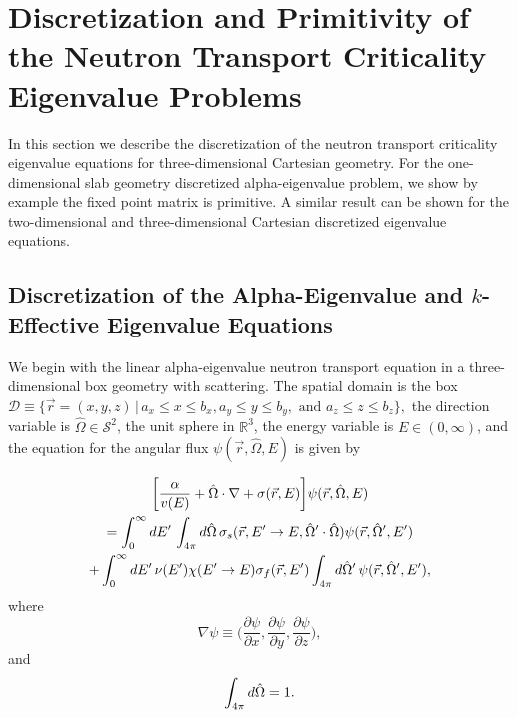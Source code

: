 \chapter{Discretization and Primitivity of the Neutron Transport Criticality Eigenvalue Problems}

In this section we describe the discretization of the neutron transport criticality eigenvalue equations for three-dimensional Cartesian geometry. For the one-dimensional slab geometry discretized alpha-eigenvalue problem, we show by example the fixed point matrix is primitive. A similar result can be shown for the two-dimensional and three-dimensional Cartesian discretized eigenvalue equations.

\section{Discretization of the Alpha-Eigenvalue and $k$-Effective Eigenvalue Equations}

We begin with the linear alpha-eigenvalue neutron transport equation in a three-dimensional box geometry with scattering. The spatial domain is the box $\mathcal{D} \equiv \{\vec{r} = (x, y, z) \, \vert \, a_{x} \leq x \leq b_{x}, a_{y} \leq y \leq b_{y}, \text{ and } a_{z} \leq z \leq b_{z} \},$ the direction variable is $\hat{\Omega} \in \mathcal{S}^{2}$, the unit sphere in $\mathbb{R}^{3}$, the energy variable is $E \in (0, \infty)$, and the equation for the angular flux $\psi(\vec{r}, \hat{\Omega}, E)$ is given by

\begin{multline}
	\bigg [ \frac{\alpha}{v(E)} + \hat{\Omega} \cdot \nabla + \sigma(\vec{r},E) \bigg ] \psi(\vec{r},\hat{\Omega},E) \\ = \int_{0}^{\infty} \mathop{}\!d E' \, \int_{4\pi} \mathop{}\!d \hat{\Omega} \, \sigma_{s}(\vec{r},E'\rightarrow E,\hat{\Omega}' \cdot \hat{\Omega}) \psi(\vec{r},\hat{\Omega}',E') \\ + \int_{0}^{\infty} \mathop{}\!d E' \, \nu(E') \chi(E'\rightarrow E) \sigma_{f}(\vec{r},E') \int_{4\pi} \mathop{}\!d \hat{\Omega}' \, \psi(\vec{r},\hat{\Omega}',E'), 
	\label{eq:Alpha3DNeutronTransport}
\end{multline}
where
\begin{equation}
	\nabla \psi \equiv \bigg (\frac{\partial \psi}{\partial x}, \frac{\partial \psi}{\partial y}, \frac{\partial \psi}{\partial z} \bigg ),
\end{equation}
and
\begin{equation}
	 \int_{4\pi} \mathop{}\!d \hat{\Omega} = 1.
\end{equation}

